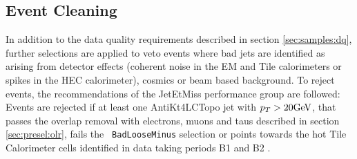 \subsection{Event Cleaning}
\label{sec:presel:celaning}

In addition to the data quality requirements described in section
\ref{sec:samples:dq}, further selections are applied to veto events
where bad jets are identified as arising from detector effects
(coherent noise in the EM and Tile calorimeters or spikes in the HEC
calorimeter), cosmics or beam based background. To reject events, the
recommendations of the JetEtMiss performance group \cite{TWIKI_JETMET}
are followed: Events are rejected if at least one AntiKt4LCTopo jet
with $p_T>20\text{GeV}$, that passes the overlap removal with electrons,
muons and taus described in section \ref{sec:presel:olr}, fails the {\tt
BadLooseMinus} selection or points towards the hot Tile Calorimeter
cells identified in data taking periods B1 and B2 \cite{hottile}.

